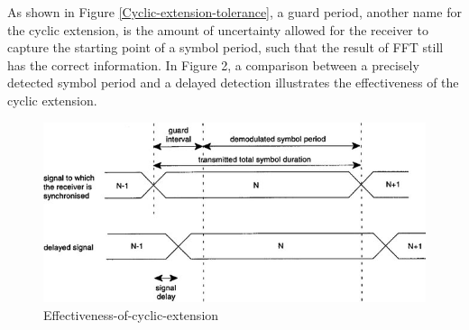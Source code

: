 As shown in Figure \ref{Cyclic-extension-tolerance}, a guard period, another name for the cyclic extension, is the amount of uncertainty allowed for the receiver to capture the starting point of a symbol period, such that the result of FFT still has the correct information. In Figure 2, a comparison between a precisely detected symbol period and a delayed detection illustrates the effectiveness of the cyclic extension.

\begin{figure}[ht]
    \centering
    \includegraphics[width=\textwidth]{Figures/Effectiveness-of-cyclic-extension}
    \caption{Effectiveness-of-cyclic-extension}
    \label{Effectiveness-of-cyclic-extension}
\end{figure}



